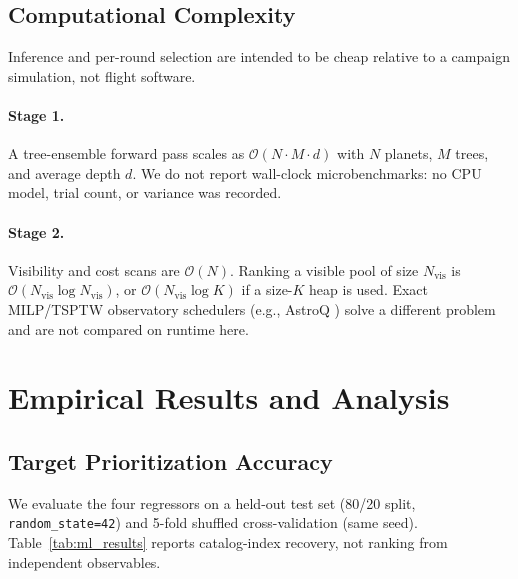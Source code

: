 \documentclass[11pt,a4paper]{article}
\begin{document}
\subsection{Computational Complexity}
\label{sec:complexity}

Inference and per-round selection are intended to be cheap relative to a campaign simulation, not flight software.

\paragraph{Stage 1.}
A tree-ensemble forward pass scales as $\mathcal{O}(N \cdot M \cdot d)$ with $N$ planets, $M$ trees, and average depth $d$. We do not report wall-clock microbenchmarks: no CPU model, trial count, or variance was recorded.

\paragraph{Stage 2.}
Visibility and cost scans are $\mathcal{O}(N)$. Ranking a visible pool of size $N_{\text{vis}}$ is $\mathcal{O}(N_{\text{vis}} \log N_{\text{vis}})$, or $\mathcal{O}(N_{\text{vis}} \log K)$ if a size-$K$ heap is used. Exact MILP/TSPTW observatory schedulers (e.g., AstroQ \cite{lubin2026astroq}) solve a different problem and are not compared on runtime here.

\section{Empirical Results and Analysis}
\label{sec:results}

\subsection{Target Prioritization Accuracy}

We evaluate the four regressors on a held-out test set (80/20 split, \texttt{random\_state=42}) and 5-fold shuffled cross-validation (same seed). Table~\ref{tab:ml_results} reports catalog-index recovery, not ranking from independent observables.
\end{document}
